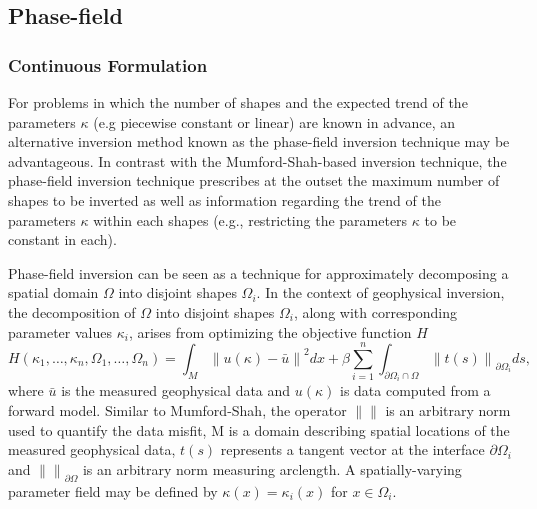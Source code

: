 \documentclass[manuscript,revised]{geophysics}
\newcommand\norm[1]{\left\lVert#1\right\rVert}
\begin{document}
\subsection{Phase-field}
\subsubsection{Continuous Formulation}

For problems in which the number of shapes and the expected trend of the parameters $\kappa$ (e.g piecewise constant or linear) are known in advance, an alternative inversion method known as the phase-field inversion technique may be advantageous. In contrast with the Mumford-Shah-based inversion technique, the phase-field inversion technique prescribes at the outset the maximum number of shapes to be inverted as well as information regarding the trend of the parameters $\kappa$ within each shapes (e.g., restricting the parameters $\kappa$ to be constant in each). 

Phase-field inversion can be seen as a technique for approximately decomposing a spatial domain $\Omega$ into disjoint shapes $\Omega_i$.  In the context of geophysical inversion, the decomposition of $\Omega$ into disjoint shapes $\Omega_i$, along with corresponding parameter values $\kappa_i$, arises from optimizing the objective function $H$
\begin{equation} \label{eq:pf}
H \left( \kappa_1,…,\kappa_n, \Omega_1,…,\Omega_n \right) = \int_M \norm{u(\kappa)-\bar{u}}^2 dx+ \beta \sum_{i=1}^n \int_{\partial\Omega_i \cap \Omega} \norm{t(s)}_{\partial\Omega_i} ds ,
\end{equation}
where $\bar{u}$ is the measured geophysical data and $u(\kappa)$ is data computed from a forward model.  Similar to Mumford-Shah, the operator $\norm{}$ is an arbitrary norm used to quantify the data misfit, M is a domain describing spatial locations of the measured geophysical data, $t(s)$ represents a tangent vector at the interface $\partial\Omega_i$ and $\norm{}_{\partial\Omega}$  is an arbitrary norm measuring arclength. A spatially-varying parameter field may be defined by $\kappa(x)=\kappa_i (x)$ for $x \in \Omega_i$.  
\end{document}

